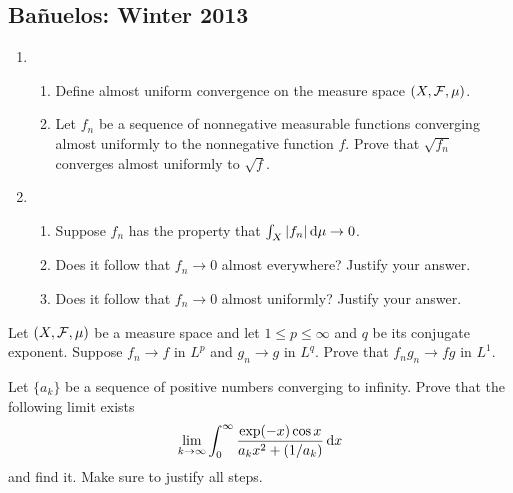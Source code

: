 \subsection{Bañuelos: Winter 2013}
\setcounter{exercise}{0}
\begin{problem}
  \hfill
  \begin{enumerate}[label=(\alph*)]
  \item \hfill
    \begin{enumerate}[label=(\roman*),noitemsep]
    \item Define almost uniform convergence on the measure space
      $(X,\mathcal{F},\mu)$.
    \item Let $f_n$ be a sequence of nonnegative measurable functions
      converging almost uniformly to the nonnegative function $f$. Prove
      that $\sqrt{f_n}$ converges almost uniformly to $\sqrt{f}$.
    \end{enumerate}
  \item \hfill
    \begin{enumerate}[label=(\roman*),noitemsep]
    \item Suppose $f_n$ has the property that $\int_X |f_n|\mathop{}\!\mathrm{d}\mu\to 0$.
    \item Does it follow that $f_n\to 0$ almost everywhere? Justify your
      answer.
    \item Does it follow that $f_n\to 0$ almost uniformly? Justify your
      answer.
    \end{enumerate}
  \end{enumerate}
\end{problem}
\begin{solution}
\end{solution}

\begin{problem}
  Let $(X,\mathcal{F},\mu)$ be a measure space and let $1\leq p\leq\infty$ and
  $q$ be its conjugate exponent. Suppose $f_n\to f$ in $L^p$ and $g_n\to g$
  in $L^q$. Prove that $f_ng_n\to fg$ in $L^1$.
\end{problem}
\begin{solution}
\end{solution}

\begin{problem}
  Let $\{a_k\}$ be a sequence of positive numbers converging to
  infinity. Prove that the following limit exists
  \[
    \lim_{k\to\infty}\int_0^\infty\frac{\exp(-x)\cos
      x}{a_kx^2+(1/a_k)}\mathop{}\!\mathrm{d} x
  \]
  and find it. Make sure to justify all steps.
\end{problem}
\begin{solution}
\end{solution}

